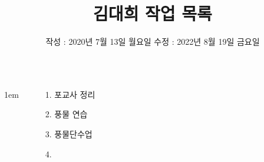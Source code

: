 \documentclass[25pt, a1paper ]{tikzposter}
\title{김대희 작업 목록 }
\author{ 	작성 : 2020년 7월 13일 월요일 	수정 : 2022년 8월 19일 금요일 }
\begin{document}
	\maketitle

	\begin{columns}
			{
					\setlength{\leftmargini}{7em}
					\setlength{\labelsep} {1em}
				\begin{LARGE}
					\begin{itemize}
					\item [1.] 포교사 정리
					\item [2.] 풍물 연습
					\item [3.] 풍물단수업
					\item [4.] 
					\end{itemize}
				\end{LARGE}
			}







%





\end{columns}
\end{document}
